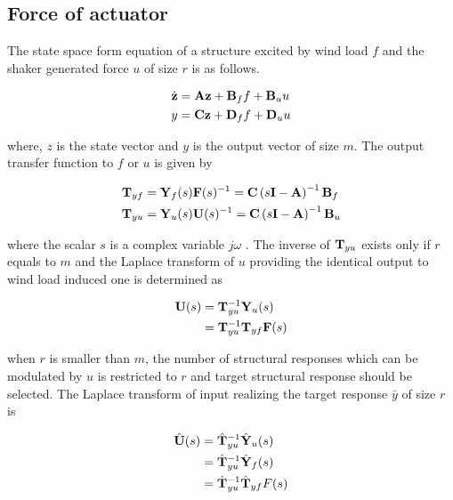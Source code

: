 \subsection{Force of actuator}
The state space form equation of a structure excited by wind load $f$ and the shaker generated force $u$ of size $r$ is as follows.

\begin{equation}
\begin{aligned}
\dot{\mathbf{z}} &=\mathbf{A}\mathbf{z}+\mathbf{B}_{f}f + \mathbf{B}_{u}u \\
y &= \mathbf{C}\mathbf{z}+\mathbf{D}_{f}f+\mathbf{D}_{u}u
\end{aligned}
\label{eq:6-1}
\end{equation}

where, $z$ is the state vector and $y$ is the output vector of size $m$. The output transfer function to $f$ or $u$ is given by

\begin{equation}
\begin{aligned}
\mathbf{T}_{yf} &= \mathbf{Y}_{f}(s)\mathbf{F}(s)^{-1} = \mathbf{C}\left(s\mathbf{I}-\mathbf{A}\right)^{-1}\mathbf{B}_{f} \\
\mathbf{T}_{yu} &= \mathbf{Y}_{u}(s)\mathbf{U}(s)^{-1} = \mathbf{C}\left(s\mathbf{I}-\mathbf{A}\right)^{-1}\mathbf{B}_{u} \\
\end{aligned}
\label{eq:6-2}
\end{equation}

where the scalar $s$ is a complex variable $j\omega$ . The inverse of $\mathbf{T}_{yu}$ exists only if $r$ equals to $m$ and the Laplace transform of $u$ providing the identical output to wind load induced one is determined as

\begin{equation}
\begin{aligned}
\mathbf{U}(s)&=\mathbf{T}_{yu}^{-1}\mathbf{Y}_{u}(s)\\
&=\mathbf{T}_{yu}^{-1}\mathbf{T}_{yf}\mathbf{F}(s)
\end{aligned}
\label{eq:6-3}
\end{equation}

when $r$ is smaller than $m$, the number of structural responses which can be modulated by $u$ is restricted to $r$ and target structural response should be selected. The Laplace transform of input realizing the target response $\bar{y}$ of size $r$ is

\begin{equation}
\begin{aligned}
\hat{\mathbf{U}}(s)&=\hat{\mathbf{T}}_{yu}^{-1}\hat{\mathbf{Y}}_{u}(s)\\
&=\hat{\mathbf{T}}_{yu}^{-1}\hat{\mathbf{Y}}_{f}(s)\\
&=\hat{\mathbf{T}}_{yu}^{-1}\hat{\mathbf{T}}_{yf}F(s)
\end{aligned}
\label{eq:6-4}
\end{equation}

